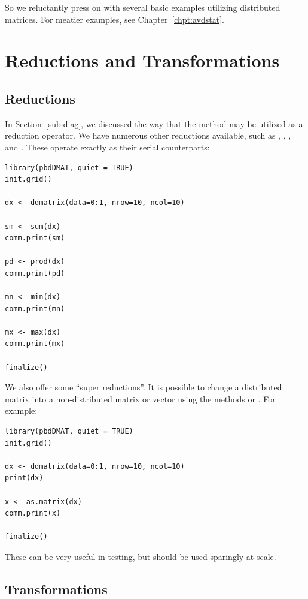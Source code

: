 So we reluctantly press on with several basic examples utilizing distributed matrices.  For meatier examples, see Chapter~\ref{chpt:avdstat}.




\section{Reductions and Transformations}

\subsection{Reductions}

In Section~\ref{sub:diag}, we discussed the way that the  method may be utilized as a reduction operator.  We have numerous other reductions available, such as , , , and .  These operate exactly as their serial counterparts:
\begin{lstlisting}[language=rr,title=Reductions]
library(pbdDMAT, quiet = TRUE)
init.grid()

dx <- ddmatrix(data=0:1, nrow=10, ncol=10)

sm <- sum(dx)
comm.print(sm)

pd <- prod(dx)
comm.print(pd)

mn <- min(dx)
comm.print(mn)

mx <- max(dx)
comm.print(mx)

finalize()
\end{lstlisting}

We also offer some ``super reductions''.  It is possible to change a distributed matrix into a non-distributed matrix or vector using the methods  or .  For example:

\begin{lstlisting}[language=rr,title=Super Reductions]
library(pbdDMAT, quiet = TRUE)
init.grid()

dx <- ddmatrix(data=0:1, nrow=10, ncol=10)
print(dx)

x <- as.matrix(dx)
comm.print(x)

finalize()
\end{lstlisting}

These can be very useful in testing, but should be used sparingly at scale.




\subsection{Transformations}

